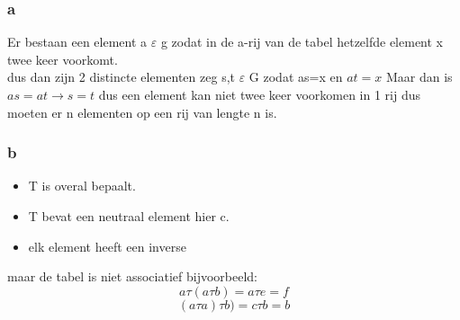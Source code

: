 \documentclass[12pt,a4paper]{article}
\begin{document}
\subsubsection*{a}

Er bestaan een element a $\varepsilon$ g zodat in de a-rij van de tabel hetzelfde element x twee keer voorkomt.
\\ dus dan zijn 2 distincte elementen zeg s,t $\varepsilon$ G zodat as=x en $at=x$ Maar dan is $as=at \rightarrow s=t$ dus een element kan niet twee keer voorkomen in 1 rij dus moeten er n elementen op een rij van lengte n is.

\subsubsection*{b}
\begin{itemize}
\item T is overal bepaalt.
\item T bevat een neutraal element hier c.
\item elk element heeft een inverse
\end{itemize}
maar de tabel is niet associatief bijvoorbeeld:
\[
a \tau (a \tau b)=a \tau e=f
\]
\[
(a \tau a) \tau b)=c \tau b=b
\]
\end{document}
